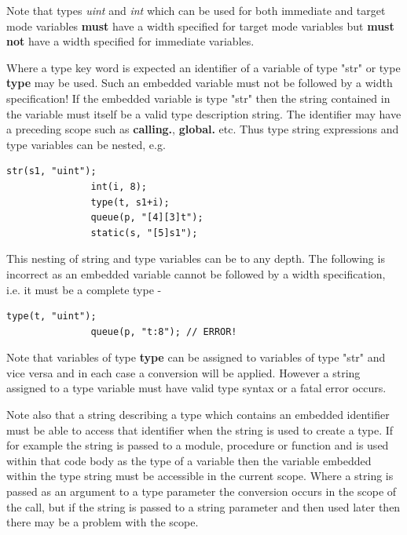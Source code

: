             Note that types {\em uint} and {\em int} which can be used for
            both immediate and target mode variables {\bf must} have a width
            specified for target mode variables but {\bf must not} have a
            width specified for immediate variables.
            
            Where a type key word is expected an identifier of a variable of type
            "str" or type {\bf type} may be used. Such an embedded variable must
            not be followed by a width specification! If the embedded variable is
            type "str" then the string contained in the variable must itself be a
            valid type description string. The identifier may have a preceding
            scope such as {\bf calling.}, {\bf global.} etc.
            Thus type string expressions and type variables can be nested,
            e.g.
            \begin{lstlisting}[gobble=12, language=threepl]
               str(s1, "uint");
               int(i, 8);
               type(t, s1+i);
               queue(p, "[4][3]t");
               static(s, "[5]s1");
            \end{lstlisting}
            This nesting of string and type variables can be to any depth.
            The following is incorrect as an embedded variable cannot be followed
            by a width specification, i.e. it must be a complete type -
            \begin{lstlisting}[gobble=12, language=threepl]
               type(t, "uint");
               queue(p, "t:8"); // ERROR!
            \end{lstlisting}
            
            Note that variables of type {\bf type} can be assigned to variables of
            type "str" and vice versa and in each case a conversion will be
            applied. However a string assigned to a type variable must have valid
            type syntax or a fatal error occurs.
            
            Note also that a string describing a type which contains an embedded
            identifier must be able to access that identifier when the string
            is used to create a type. If for example the string is passed
            to a module, procedure or function and is used within that
            code body as the type of a variable then the variable embedded
            within the type string must be accessible in the current scope.
            Where a string is passed as an argument to a type parameter the
            conversion occurs in the scope of the call, but if the string
            is passed to a string parameter and then used later then there
            may be a problem with the scope.
            
